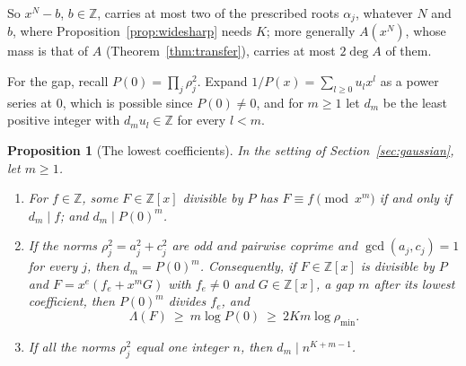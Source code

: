 \documentclass[11pt]{article}
\newtheorem{proposition}[theorem]{Proposition}
\begin{document}
So $x^N-b$, $b\in\mathbb Z$, carries at most two of the prescribed roots
$\alpha_j$, whatever $N$ and $b$, where Proposition~\ref{prop:widesharp} needs
$K$; more generally $A(x^N)$, whose mass is that of $A$
(Theorem~\ref{thm:transfer}), carries at most $2\deg A$ of them.

For the gap, recall $P(0)=\prod_j\rho_j^2$.  Expand
$1/P(x)=\sum_{l\ge0}u_lx^l$ as a power series at $0$, which is possible since
$P(0)\ne0$, and for $m\ge1$ let $d_m$ be the least positive integer with
$d_mu_l\in\mathbb Z$ for every $l<m$.

\begin{proposition}[The lowest coefficients]\label{prop:gausslow}
In the setting of Section~\ref{sec:gaussian}, let $m\ge1$.
\begin{enumerate}
\item For $f\in\mathbb Z$, some $F\in\mathbb Z[x]$ divisible by $P$ has
$F\equiv f\pmod{x^m}$ if and only if $d_m\mid f$; and $d_m\mid P(0)^m$.
\item If the norms $\rho_j^2=a_j^2+c_j^2$ are odd and pairwise coprime and
$\gcd(a_j,c_j)=1$ for every $j$, then $d_m=P(0)^m$.  Consequently, if
$F\in\mathbb Z[x]$ is divisible by $P$ and $F=x^e(f_e+x^mG)$ with $f_e\ne0$
and $G\in\mathbb Z[x]$, a gap $m$ after its lowest coefficient, then $P(0)^m$
divides $f_e$, and
\[
  \Lambda(F)\ \ge\ m\log P(0)\ \ge\ 2Km\log\rho_{\min}.
\]
\item If all the norms $\rho_j^2$ equal one integer $n$, then
$d_m\mid n^{K+m-1}$.
\end{enumerate}
\end{proposition}
\end{document}
